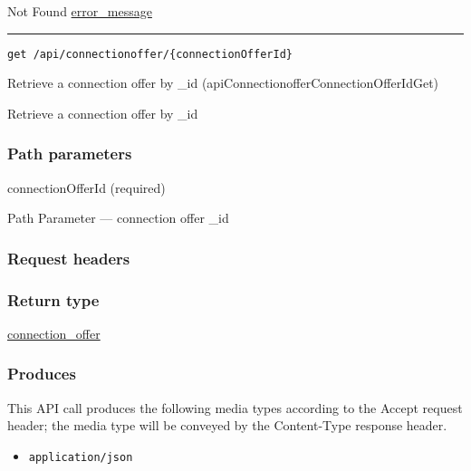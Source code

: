 Not Found \protect\hyperlink{error_message}{error\_message}

\begin{center}\rule{0.5\linewidth}{\linethickness}\end{center}

\protect\hypertarget{apiConnectionofferConnectionOfferIdGet}{}{}

\begin{verbatim}
get /api/connectionoffer/{connectionOfferId}
\end{verbatim}

Retrieve a connection offer by \_id
({apiConnectionofferConnectionOfferIdGet})

Retrieve a connection offer by \_id

\hypertarget{path-parameters-13}{%
\subsubsection{Path parameters}\label{path-parameters-13}}

connectionOfferId (required)

{Path Parameter} --- connection offer \_id

\hypertarget{request-headers-7}{%
\subsubsection{Request headers}\label{request-headers-7}}

\hypertarget{return-type-15}{%
\subsubsection{Return type}\label{return-type-15}}

\protect\hyperlink{connection_offer}{connection\_offer}

\hypertarget{produces-20}{%
\subsubsection{Produces}\label{produces-20}}

This API call produces the following media types according to the
{Accept} request header; the media type will be conveyed by the
{Content-Type} response header.

\begin{itemize}
\tightlist
\item
  \texttt{application/json}
\end{itemize}

